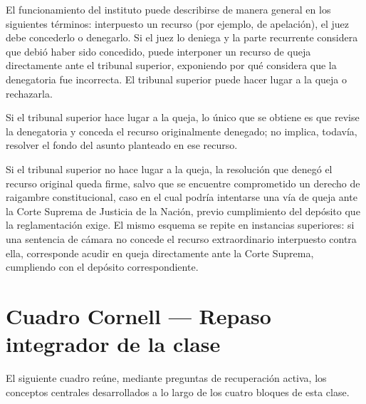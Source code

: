 \documentclass[12pt,oneside]{book}
\begin{document}
El funcionamiento del instituto puede describirse de manera general en los siguientes términos: interpuesto un recurso (por ejemplo, de apelación), el juez debe concederlo o denegarlo. Si el juez lo deniega y la parte recurrente considera que debió haber sido concedido, puede interponer un recurso de queja directamente ante el tribunal superior, exponiendo por qué considera que la denegatoria fue incorrecta. El tribunal superior puede hacer lugar a la queja o rechazarla.

\begin{important}
Si el tribunal superior hace lugar a la queja, lo único que se obtiene es que revise la denegatoria y conceda el recurso originalmente denegado; no implica, todavía, resolver el fondo del asunto planteado en ese recurso.
\end{important}

\begin{note}
Si el tribunal superior no hace lugar a la queja, la resolución que denegó el recurso original queda firme, salvo que se encuentre comprometido un derecho de raigambre constitucional, caso en el cual podría intentarse una vía de queja ante la Corte Suprema de Justicia de la Nación, previo cumplimiento del depósito que la reglamentación exige. El mismo esquema se repite en instancias superiores: si una sentencia de cámara no concede el recurso extraordinario interpuesto contra ella, corresponde acudir en queja directamente ante la Corte Suprema, cumpliendo con el depósito correspondiente.
\end{note}


\chapter*{Cuadro Cornell --- Repaso integrador de la clase}

El siguiente cuadro reúne, mediante preguntas de recuperación activa, los conceptos centrales desarrollados a lo largo de los cuatro bloques de esta clase.
\end{document}
